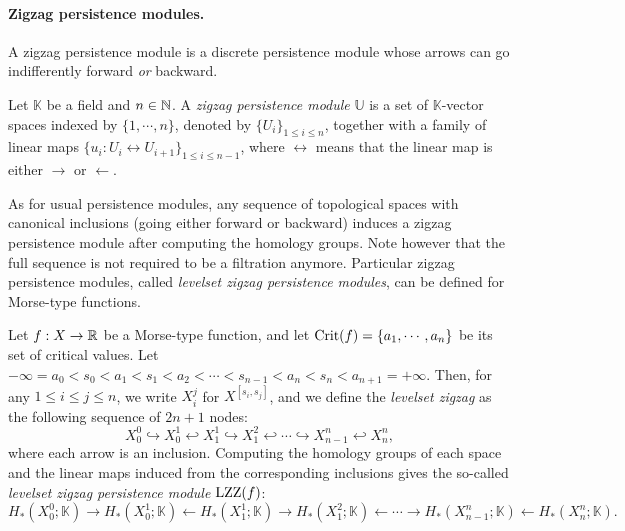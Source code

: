 
\paragraph*{Zigzag persistence modules.} A zigzag persistence module is a discrete persistence module whose arrows can go
indifferently  forward {\em or} backward.

\begin{defin}
Let $\mathbb K$ be a field and $n\in\mathbb{N}$. 
A {\em zigzag persistence module} $\mathbb U$ is a set of $\mathbb{K}$-vector spaces indexed by $\{1,\cdots,n\}$, denoted by
$\{U_i\}_{1\leq i\leq n}$,
together with a family of linear maps $\{u_i:U_i\leftrightarrow U_{i+1}\}_{1\leq i\leq n-1}$, where $\leftrightarrow$
means that the linear map is either $\rightarrow$ or $\leftarrow$.
\end{defin}

As for usual persistence modules, any sequence of topological spaces with canonical inclusions (going either forward or backward) 
induces a zigzag persistence module after computing the homology groups. Note however that the full sequence is not required to be a filtration anymore.
Particular zigzag persistence modules, called {\em levelset zigzag persistence modules}, can be defined for Morse-type functions.

\begin{defin}\label{def:LZZ} 
Let $f:X\rightarrow\mathbb{R}$ be a Morse-type function, 
and let $\mathrm{Crit}(f)=\{a_1,\cdots,a_n\}$ be its set of critical values.
Let $-\infty=a_0<s_0<a_1<s_1<a_2<\cdots<s_{n-1}<a_n<s_n<a_{n+1}=+\infty$. Then, for any $1\leq i \leq j \leq n$, we write $X_i^j$ for $X^{[s_i,s_j]}$,
and we define the {\em levelset zigzag} as the following sequence of $2n+1$ nodes:
$$X_0^0\hookrightarrow X_0^1 \hookleftarrow X_1^1 \hookrightarrow X_1^2 \hookleftarrow \cdots \hookrightarrow X_{n-1}^n \hookleftarrow X_n^n,$$
where each arrow is an inclusion. %
Computing the homology groups of each space and the linear maps induced from the corresponding inclusions gives the so-called
{\em levelset zigzag persistence module} $\mathrm{LZZ}(f)$:
$$H_*(X_0^0;\mathbb K)\rightarrow H_*(X_0^1;\mathbb K)\leftarrow H_*(X_1^1;\mathbb K) \rightarrow H_*(X_1^2;\mathbb K) 
\leftarrow \cdots \rightarrow H_*(X_{n-1}^n;\mathbb K) \leftarrow H_*(X_n^n;\mathbb K).$$
\end{defin}


